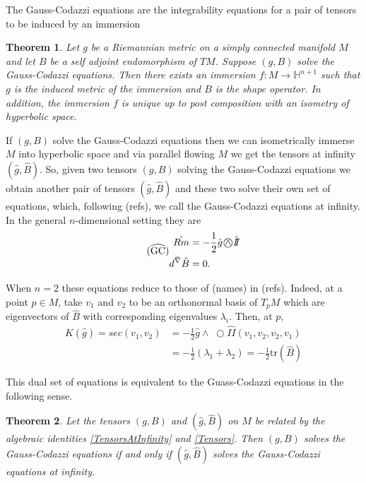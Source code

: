 \documentclass{amsart}
\newcommand{\two}{I\!\!I}
\newcommand{\tr}{\mathrm{tr}}
\newcommand{\wtimes}{\wedge \!\!\!\!\!\!\!\!\;\bigcirc}
\newtheorem{thm}{Theorem}[section]
\renewcommand{\H}{\mathbb{H}}
\begin{document}
The Gauss-Codazzi equations are the integrability equations for a pair of tensors to be induced by an immersion

\begin{thm}
Let $g$ be a Riemannian metric on a simply connected manifold $M$ and let $B$ be a self adjoint endomorphism of $TM$. 
Suppose $(g,B)$ solve the Gauss-Codazzi equations. 
Then there exists an immersion $f: M \to \H^{n+1}$ such that $g$ is the induced metric of the immersion and $B$ is the shape operator. 
In addition, the immersion $f$ is unique up to post composition with an isometry of hyperbolic space. 
\end{thm}

If $(g,B)$ solve the Gauss-Codazzi equations then we can isometrically immerse $M$ into hyperbolic space and via parallel flowing $M$ we get the tensors at infinity $(\hat{g},\hat{B})$.
So, given two tensors $(g,B)$ solving the Gauss-Codazzi equations we obtain another pair of tensors $(\hat{g},\hat{B})$ and these two solve their own set of equations, which, following (refs), we call the Gauss-Codazzi equations at infinity.
In the general $n$-dimensional setting they are 
\begin{equation}
\label{GCInf} \tag{$\widehat{\text{GC}}$}
\begin{aligned}
\hat{Rm} &= -\frac{1}{2} \hat{g} \wtimes \hat{\two} \\
d^{\hat{\nabla}} \hat{B} &= 0.
\end{aligned}
\end{equation}

When $n = 2$ these equations reduce to those of (names) in (refs).
Indeed, at a point $p \in M$, take $v_1$ and $v_2$ to be an orthonormal basis of $T_pM$ which are eigenvectors of $\hat{B}$ with corresponding eigenvalues $\lambda_i$.
Then, at $p$,
\begin{align*}
K(\hat{g}) 
= sec(v_1,v_2) 
&= -\frac{1}{2}\hat{g}\wtimes \hat{\two}(v_1,v_2,v_2,v_1) \\
&= -\frac{1}{2}( \lambda_1 + \lambda_2)
= -\frac{1}{2}\tr(\hat{B})
\end{align*}


This dual set of equations is equivalent to the Guass-Codazzi equations in the following sense.


\begin{thm}
\label{DualEquations}
Let the tensors $(g,B)$ and $(\hat{g},\hat{B})$ on $M$ be related by the algebraic identities \eqref{TensorsAtInfinity} and \eqref{Tensors}. 
Then $(g,B)$ solves the Gauss-Codazzi equations if and only if $(\hat{g},\hat{B})$ solves the Gauss-Codazzi equations at infinity.
\end{thm}
\end{document}
